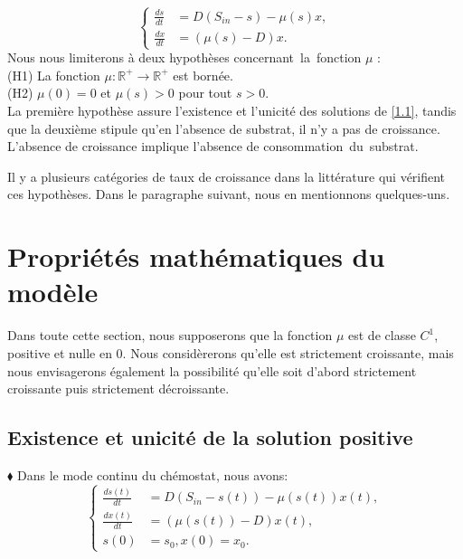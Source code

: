 \documentclass[12pt,a4paper]{report}%
\newcounter{Prop}[section] %
\begin{document}
\begin{equation}\label{1.1}
\left\{\begin{aligned}
\frac{d s}{d t} & =D \left(S_{in}-s\right) - \mu(s)x, \\
\frac{d x}{d t} & =(\mu(s)-D) x .
\end{aligned}\right.
\end{equation}
Nous nous limiterons à deux hypothèses concernant la fonction $\mu$ :\\
(H1) La fonction $\mu: \mathbb{R}^{+} \rightarrow \mathbb{R}^{+}$ est bornée.\\
(H2) $\mu(0)=0$ et $\mu(s)>0$ pour tout $s>0$.\\
La première hypothèse assure l'existence et l'unicité des solutions de \eqref{1.1}, tandis que la deuxième stipule qu'en l'absence de substrat, il n'y a pas de croissance. L'absence de croissance implique l'absence de consommation du substrat.

Il y a plusieurs catégories de taux de croissance dans la littérature qui vérifient ces hypothèses. Dans le paragraphe suivant, nous en mentionnons quelques-uns. 

\section{Propriétés mathématiques du modèle}
Dans toute cette section, nous supposerons que la fonction \(\mu\) est de classe \(C^1\), positive et nulle en 0. Nous considèrerons qu'elle est strictement croissante, mais nous envisagerons également la possibilité qu'elle soit d'abord strictement croissante puis strictement décroissante.
\subsection{Existence et unicité de la solution positive}
$\blacklozenge$ Dans le mode continu du chémostat, nous avons:
\begin{equation}\label{1.2}
\left\{\begin{aligned}
\frac{ds(t)}{dt} & = D \left(S_{in} - s(t)\right) - \mu(s(t))x(t), \\
\frac{dx(t)}{dt} & = (\mu(s(t)) - D)x (t),\\
s(0)&=s_0, x(0)=x_0.
\end{aligned}\right.
\end{equation}
\end{document}
